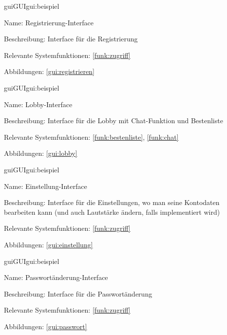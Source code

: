 \begin{description}[leftmargin=5em, style=sameline]	
	\begin{lhp}{gui}{GUI}{gui:beispiel}
		\item[Name:] Registrierung-Interface
		\item[Beschreibung:] Interface für die Registrierung
		\item[Relevante Systemfunktionen:] \ref{funk:zugriff}
		\item[Abbildungen:] \ref{gui:registrieren}
	\end{lhp}
\end{description}

\begin{description}[leftmargin=5em, style=sameline]	
	\begin{lhp}{gui}{GUI}{gui:beispiel}
		\item[Name:] Lobby-Interface
		\item[Beschreibung:] Interface für die Lobby mit Chat-Funktion und Bestenliste
		\item[Relevante Systemfunktionen:] \ref{funk:bestenliste}, \ref{funk:chat}
		\item[Abbildungen:] \ref{gui:lobby}
	\end{lhp}
\end{description}

\begin{description}[leftmargin=5em, style=sameline]	
	\begin{lhp}{gui}{GUI}{gui:beispiel}
		\item[Name:] Einstellung-Interface
		\item[Beschreibung:] Interface für die Einstellungen, wo man seine Kontodaten bearbeiten kann (und auch Lautstärke ändern, falls implementiert wird)
		\item[Relevante Systemfunktionen:] \ref{funk:zugriff}
		\item[Abbildungen:] \ref{gui:einstellung}
	\end{lhp}
\end{description}

\begin{description}[leftmargin=5em, style=sameline]	
	\begin{lhp}{gui}{GUI}{gui:beispiel}
		\item[Name:] Passwortänderung-Interface
		\item[Beschreibung:] Interface für die Passwortänderung
		\item[Relevante Systemfunktionen:] \ref{funk:zugriff}
		\item[Abbildungen:] \ref{gui:passwort}
	\end{lhp}
\end{description}

